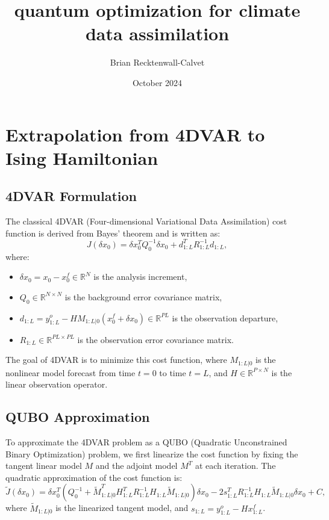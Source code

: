 \documentclass{article}
\title{quantum optimization for climate data assimilation}
\author{Brian Recktenwall-Calvet}
\date{October 2024}
\begin{document}
\maketitle


\section{Extrapolation from 4DVAR to Ising Hamiltonian}

\subsection{4DVAR Formulation}

The classical 4DVAR (Four-dimensional Variational Data Assimilation) cost function is derived from Bayes' theorem and is written as:
\[
J (\delta x_0) = \delta x_0^T Q_0^{-1} \delta x_0 + d_{1:L}^T R_{1:L}^{-1} d_{1:L},
\]
where:
\begin{itemize}
    \item \( \delta x_0 = x_0 - x^f_0 \in \mathbb{R}^N \) is the analysis increment,
    \item \( Q_0 \in \mathbb{R}^{N \times N} \) is the background error covariance matrix,
    \item \( d_{1:L} = y_{1:L}^o - H M_{1:L|0} (x^f_0 + \delta x_0) \in \mathbb{R}^{PL} \) is the observation departure,
    \item \( R_{1:L} \in \mathbb{R}^{PL \times PL} \) is the observation error covariance matrix.
\end{itemize}
The goal of 4DVAR is to minimize this cost function, where \( M_{1:L|0} \) is the nonlinear model forecast from time \( t = 0 \) to time \( t = L \), and \( H \in \mathbb{R}^{P \times N} \) is the linear observation operator.

\subsection{QUBO Approximation}

To approximate the 4DVAR problem as a QUBO (Quadratic Unconstrained Binary Optimization) problem, we first linearize the cost function by fixing the tangent linear model \( M \) and the adjoint model \( M^T \) at each iteration. The quadratic approximation of the cost function is:
\[
\tilde{J} (\delta x_0) = \delta x_0^T \left( Q_0^{-1} + \tilde{M}^T_{1:L|0} H^T_{1:L} R_{1:L}^{-1} H_{1:L} \tilde{M}_{1:L|0} \right) \delta x_0 - 2 s^T_{1:L} R_{1:L}^{-1} H_{1:L} \tilde{M}_{1:L|0} \delta x_0 + C,
\]
where \( \tilde{M}_{1:L|0} \) is the linearized tangent model, and \( s_{1:L} = y^o_{1:L} - H x^f_{1:L} \).
\end{document}
